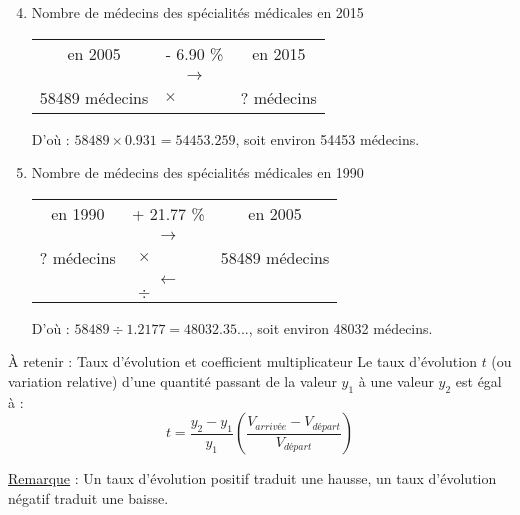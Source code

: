 \documentclass[xcolor={dvipsnames}]{beamer}
\begin{document}
\begin{frame}{}
\begin{enumerate}%
	\setcounter{enumi}{3}
	
	\item Nombre de médecins des spécialités médicales en 2015 \pause
	
	\begin{table}[h!]
		\centering
		\begin{tabular}{|ccc|}
			\hline
			en \num{2005} & - \num{6.90} \%  & en \num{2015} \\
			& {\LARGE $\rightarrow$} &			\\
			\num{58489} médecins& $\times \qquad \quad $ & ? médecins \\
			\hline
		\end{tabular}
	\end{table}\pause
	
	D'où : $\num{58489} \times \num{0.931} = \num{54453.259}$, soit environ \num{54453} médecins.\pause
	
	
	\item Nombre de médecins des spécialités médicales en 1990 \pause
	
	\begin{table}[h!]
		\centering
		\begin{tabular}{|ccc|}
			\hline
			en \num{1990} & + \num{21.77} \%  & en \num{2005} \\
			& {\LARGE $\rightarrow$} &			\\
			? médecins& $\times \qquad \quad $ & \num{58489} médecins \\
			\hline
			& {\LARGE $\leftarrow$} & \\
			& $\div \qquad  \quad $ & \\
			\hline
		\end{tabular}
	\end{table}\pause
	
	D'où : $\num{58489} \div \num{1.2177} = \num{48032.35}...$, soit environ \num{48032} médecins.
\end{enumerate}
\end{frame}

\begin{frame}

\begin{alertblock}{\`A retenir : Taux d'évolution et coefficient multiplicateur}
	Le taux d'évolution $t$ (ou variation relative) d'une quantité passant de la valeur $y_1$ à une valeur $y_2$ est égal à :
	\begin{equation*}
	t = \dfrac{y_2 - y_1}{y_1} \left(\dfrac{V_{arrivée} - V_{départ}}{V_{départ}}\right)
	\end{equation*}
	
	\underline{Remarque} : Un taux d'évolution positif traduit une hausse, un taux d'évolution négatif traduit une baisse.\\
	
	
	
	
\end{alertblock}

\end{frame}
\end{document}

